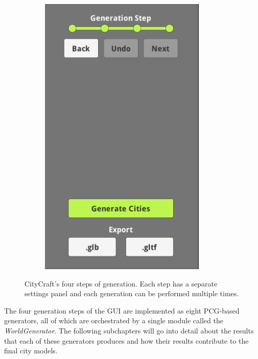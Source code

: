 \begin{figure}[H]
\begin{subfigure}[b]{0.24\textwidth}
    \includegraphics[width=\textwidth]{figure/results/gui4.png}
  \end{subfigure}

  \caption{CityCraft's four steps of generation. Each step has a separate settings panel and each generation can be performed multiple times.}
  \label{fig:guisteps}
\end{figure}

The four generation steps of the GUI are implemented as eight PCG-based generators, all of which are orchestrated by a single module called the \textit{WorldGenerator}.
The following subchapters will go into detail about the results that each of these generators produces and how their results contribute to the final city models.








